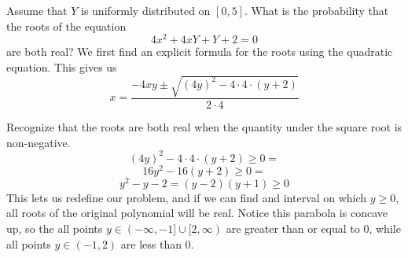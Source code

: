 \documentclass{exam}
\begin{document}
\begin{questions}

\newpage
\question
Assume that $Y$ is uniformly distributed on $[0, 5]$. What is the probability that the roots of the equation
$$4x^2 + 4xY + Y + 2 = 0$$
are both real?
\sol
We first find an explicit formula for the roots using the quadratic equation. This gives us
$$x = \frac{-4xy \pm \sqrt{(4y)^2-4\cdot4\cdot(y + 2)}}{2 \cdot 4}$$

Recognize that the roots are both real when the quantity under the square root is non-negative.
$$(4y)^2-4\cdot4\cdot(y + 2) \geq 0 =$$
$$16y^2 - 16(y + 2) \geq 0 =$$
\begin{equation}
    y^2 - y - 2 = (y - 2)(y + 1) \geq 0
\end{equation}
This lets us redefine our problem, and if we can find and interval on which $y \geq 0$, all roots of the original polynomial will be real. Notice this parabola is concave up, so the all points $y \in (-\infty, -1] \cup [2, \infty)$ are greater than or equal to 0, while all points $y \in (-1, 2)$ are less than 0.


\end{questions}
\end{document}
